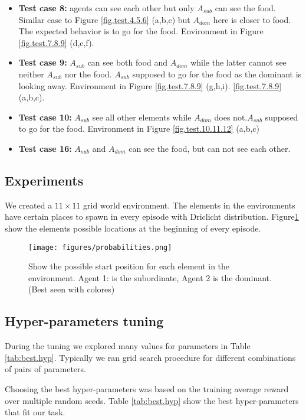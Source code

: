 \documentclass{article}
\begin{document}
\begin{itemize}
\item \textbf {Test case 8:} agents can see each other but only \(A_{sub}\) can see the food. Similar case to Figure \ref{fig.test.4.5.6} (a,b,c) but \(A_{dom}\) here is closer to food. The expected behavior is to go for the food. Environment in Figure \ref{fig.test.7.8.9} (d,e,f).
\item \textbf {Test case 9:} \(A_{sub}\) can see both food and \(A_{dom}\) while the latter cannot see neither \(A_{sub}\) nor the food. \(A_{sub}\) supposed to go for the food as the dominant is looking away. Environment in Figure \ref{fig.test.7.8.9} (g,h,i).
\ref{fig.test.7.8.9} (a,b,c).

\item \textbf {Test case 10:} \(A_{sub}\) see all other elements while \(A_{dom}\) does not.\(A_{sub}\) supposed to go for the food. Environment in Figure \ref{fig.test.10.11.12} (a,b,c)

\item \textbf {Test  case 16:} \(A_{sub}\) and \(A_{dom}\) can see the food, but can not see each other.
\end{itemize}
\subsection{Experiments}
We created a $11\times11$ grid world environment. The elements in the environments have certain places to spawn in every episode with Driclicht distribution. Figure\ref{fig:probabilities} show the elements possible locations at the beginning of every episode. 
\begin{figure}[H]
    \centering
    \texttt{[image: figures/probabilities.png]}
    \caption{Show the possible start position for each element in the environment. Agent 1: is the subordinate, Agent 2 is the dominant.(Best seen with colores)}
    \label{fig:probabilities}
\end{figure}
\subsection{Hyper-parameters tuning}
During the tuning we explored many values for parameters in Table \ref{tab:best.hyp}. Typically we ran grid search procedure for different combinations of pairs of parameters.
\par Choosing the best hyper-parameters was based on the training average reward over multiple random seeds. Table \ref{tab:best.hyp}  show the best hyper-parameters that fit our task.
\end{document}

